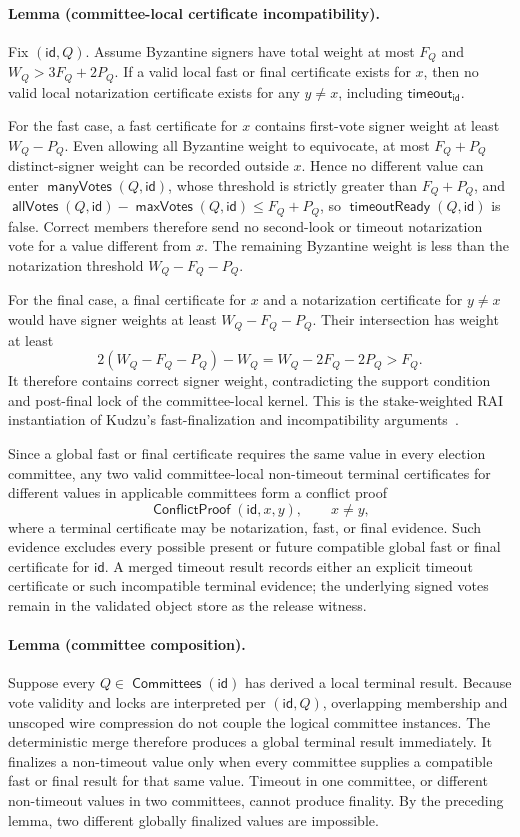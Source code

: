 \documentclass[sigplan,twocolumn,review,anonymous]{acmart}
\newcommand{\func}[1]{\operatorname{\mathsf{#1}}}
\newcommand{\ConflictProof}{\func{ConflictProof}}
\newcommand{\manyVotes}{\func{manyVotes}}
\newcommand{\allVotes}{\func{allVotes}}
\newcommand{\maxVotes}{\func{maxVotes}}
\newcommand{\id}{\mathsf{id}}
\newcommand{\timeoutVal}{\mathsf{timeout}}
\newcommand{\Committees}{\func{Committees}}
\newcommand{\timeoutReady}{\func{timeoutReady}}
\begin{document}
\paragraph{Lemma (committee-local certificate incompatibility).}
Fix \((\id,Q)\).  Assume Byzantine signers have total weight at most \(F_Q\) and
\(W_Q>3F_Q+2P_Q\).  If a valid local fast or final certificate exists for \(x\), then no valid local
notarization certificate exists for any \(y\neq x\), including \(\timeoutVal_\id\).

For the fast case, a fast certificate for \(x\) contains first-vote signer weight at least
\(W_Q-P_Q\).  Even allowing all Byzantine weight to equivocate, at most \(F_Q+P_Q\) distinct-signer
weight can be recorded outside \(x\).  Hence no different value can enter \(\manyVotes(Q,\id)\), whose
threshold is strictly greater than \(F_Q+P_Q\), and
\(\allVotes(Q,\id)-\maxVotes(Q,\id)\le F_Q+P_Q\), so \(\timeoutReady(Q,\id)\) is false.  Correct
members therefore send no second-look or timeout notarization vote for a value different from \(x\).
The remaining Byzantine weight is less than the notarization threshold \(W_Q-F_Q-P_Q\).

For the final case, a final certificate for \(x\) and a notarization certificate for \(y\neq x\) would
have signer weights at least \(W_Q-F_Q-P_Q\).  Their intersection has weight at least
\[
2(W_Q-F_Q-P_Q)-W_Q=W_Q-2F_Q-2P_Q>F_Q.
\]
It therefore contains correct signer weight, contradicting the support condition and post-final lock of
the committee-local kernel.  This is the stake-weighted RAI instantiation of Kudzu's fast-finalization
and incompatibility arguments~\cite[Lemmas~5.4--5.7]{shoup2025kudzu}.

Since a global fast or final certificate requires the same value in every election committee, any two
valid committee-local non-timeout terminal certificates for different values in applicable committees
form a conflict proof
\[
\ConflictProof(\id,x,y),\qquad x\neq y,
\]
where a terminal certificate may be notarization, fast, or final evidence.  Such evidence excludes every
possible present or future compatible global fast or final certificate for \(\id\).  A merged timeout
result records either an explicit timeout certificate or such incompatible terminal evidence; the
underlying signed votes remain in the validated object store as the release witness.

\paragraph{Lemma (committee composition).}
Suppose every \(Q\in\Committees(\id)\) has derived a local terminal result.  Because vote validity and
locks are interpreted per \((\id,Q)\), overlapping membership and unscoped wire compression do not
couple the logical committee instances.  The deterministic merge therefore produces a global terminal
result immediately.  It finalizes a non-timeout value only when every committee supplies a compatible
fast or final result for that same value.  Timeout in one committee, or different non-timeout values in
two committees, cannot produce finality.  By the preceding lemma, two different globally finalized
values are impossible.
\end{document}

